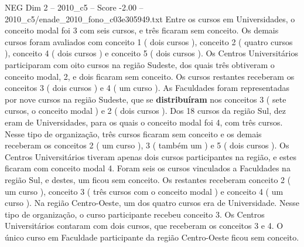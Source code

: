 \begin{textsample}{NEG Dim 2 – 2010\_c5 – Score -2.00 – 2010\_c5/enade\_2010\_fono\_c03e305949.txt}
Entre os cursos em Universidades, o conceito modal foi 3 com seis cursos, e três ficaram sem conceito.
Os demais cursos foram avaliados com conceito 1 ( dois cursos ), conceito 2 ( quatro cursos ), conceito 4 ( dois cursos ) e conceito 5 ( dois cursos ).
Os Centros Universitários participaram com oito cursos na região Sudeste, dos quais três obtiveram o conceito modal, 2, e dois ficaram sem conceito.
Os cursos restantes receberam os conceitos 3 ( dois cursos ) e 4 ( um curso ).
As Faculdades foram representadas por nove cursos na região Sudeste, que se \textbf{distribuíram} nos conceitos 3 ( sete cursos, o conceito modal ) e 2 ( dois cursos ).
Dos 18 cursos da região Sul, dez eram de Universidades, para os quais o conceito modal foi 4, com três cursos.
Nesse tipo de organização, três cursos ficaram sem conceito e os demais receberam os conceitos 2 ( um curso ), 3 ( também um ) e 5 ( dois cursos ).
Os Centros Universitários tiveram apenas dois cursos participantes na região, e estes ficaram com conceito modal 4.
Foram seis os cursos vinculados a Faculdades na região Sul, e destes, um ficou sem conceito.
Os restantes receberam conceito 2 ( um curso ), conceito 3 ( três cursos com o conceito modal ) e conceito 4 ( um curso ).
Na região Centro-Oeste, um dos quatro cursos era de Universidade.
Nesse tipo de organização, o curso participante recebeu conceito 3.
Os Centros Universitários contaram com dois cursos, que receberam os conceitos 3 e 4.
O único curso em Faculdade participante da região Centro-Oeste ficou sem conceito.

\end{textsample}
